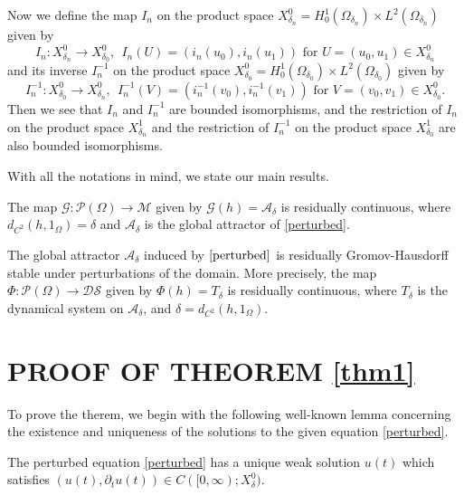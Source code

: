 \documentclass[11pt]{amsart}
\begin{document}
Now we define the map $I_n$ on the product space  $X^0_{\delta_n}= H_0^1(\Omega_{\delta_n}) \times L^2(\Omega_{\delta_n})$ given by 
\begin{equation}\label{I_n}
I_n: X^0_{\delta_n}\rightarrow X^0_{\delta_0}, \ \
I_n(U) =(i_n(u_0), i_n(u_1)) \text { for } U=(u_0, u_1) \in X^0_{\delta_n}
\end{equation}
and its inverse $I_n^{-1}$ on the product space $X^0_{\delta_0}= H_0^1(\Omega_{\delta_0}) \times L^2(\Omega_{\delta_0})$ given by
$$ I_n^{-1}: X^0_{\delta_0}\rightarrow X^0_{\delta_n}, \ \  I_n^{-1}(V) =(i_n^{-1}(v_0), i_n^{-1}(v_1)) \text { for } V=(v_0, v_1) \in X^0_{\delta_0}.$$
Then we see that $I_n$ and $I_n^{-1}$ are bounded isomorphisms, and the restriction of  $I_n$ on the product space $X^1_{\delta_n}$ and the restriction of  $I_n^{-1}$ on the product space $X^1_{\delta_0}$ are also bounded isomorphisms.

With all the notations in mind, we state our main results.

\begin{theorem}\label{thm1}
    The map $\mathcal{G}: \mathcal P(\Omega) \rightarrow\mathcal{M}$ given by $\mathcal{G}(h) = \mathcal{A}_{\delta}$ is residually continuous, where $d_{C^2}(h, 1_\Omega)=\delta$ and $\mathcal{A}_{\delta}$ is the global attractor of \eqref{perturbed}.
\end{theorem}

\begin{theorem}\label{thm2}
    The global attractor $\mathcal{A}_{\delta}$ induced by $\eqref{perturbed}$ is residually Gromov-Hausdorff stable under perturbations of the domain. More precisely, the map $\Phi: \mathcal P(\Omega)\to \mathcal{DS}$ given by $\Phi(h) = T_{\delta}$ is residually continuous, where $T_{\delta}$ is the dynamical system on $\mathcal{A}_\delta$, and $\delta =d_{C^2}(h,1_\Omega)$.
\end{theorem}


\section{{PROOF OF THEOREM \ref{thm1}}}

To prove the therem, we begin with  the following well-known lemma concerning the existence and uniqueness of the solutions to the given equation \eqref{perturbed}.

\begin{lemma}\label{lem wellposed}
    The perturbed equation \eqref{perturbed} has a unique weak solution $u(t)$ which satisfies  $(u(t), \partial_t u(t))\in C([0,\infty);X_\delta^0)$.
\end{lemma}
\end{document}

